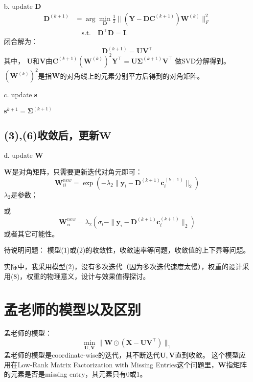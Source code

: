 \documentclass[10pt,twocolumn,letterpaper]{article}
\begin{document}
b. update $\mathbf{D}$
\begin{equation}
\begin{split}
\mathbf{D}^{(k+1)}
&
=
\arg\min_{\mathbf{D}}\frac{1}{2}\|(\mathbf{Y}-\mathbf{D}\mathbf{C}^{(k+1)})\mathbf{W}^{(k)}\|_{F}^{2}
\\
&
\quad
\text{s.t.}
\quad
\mathbf{D}^{\top}\mathbf{D} =\mathbf{I}. 
\end{split}
\end{equation}
闭合解为：
\begin{equation}
\mathbf{D}^{(k+1)}
=
\mathbf{U}\mathbf{V}^{\top}
\end{equation}
其中，
$\mathbf{U}$和$\mathbf{V}$由$\mathbf{C}^{(k+1)}(\mathbf{W}^{(k)})^{2}\mathbf{Y}^{\top}=\mathbf{U}\mathbf{\Sigma}^{(k+1)}\mathbf{V}^{\top}
$
做SVD分解得到。$(\mathbf{W}^{(k)})^{2}$是指$\mathbf{W}$的对角线上的元素分别平方后得到的对角矩阵。

c. update $\mathbf{s}$

$\mathbf{s}^{k+1}=\mathbf{\Sigma}^{(k+1)}$

\subsection{(3),(6)收敛后，更新$\mathbf{W}$}
d. update $\mathbf{W}$

$\mathbf{W}$是对角矩阵，只需要更新迭代对角元即可：
\begin{equation}
\mathbf{W}_{ii}^{new}=\exp(-\lambda_{2}\|\mathbf{y}_{i}-\mathbf{D}^{(k+1)}\mathbf{c}_{i}^{(k+1)}\|_{2})
\end{equation}
$\lambda_{2}$是参数；

或
\begin{equation}
\mathbf{W}_{ii}^{new}=\lambda_{2}(\sigma_{i}-\|\mathbf{y}_{i}-\mathbf{D}^{(k+1)}\mathbf{c}_{i}^{(k+1)}\|_{2})
\end{equation}
或者其它可能性。

待说明问题：
模型(1)或(2)的收敛性，收敛速率等问题，收敛值的上下界等问题。

实际中，我采用模型(2)，没有多次迭代（因为多次迭代速度太慢），权重的设计采用(8)，权重的物理意义，设计与效果值得探讨。

\section{孟老师的模型以及区别}
孟老师的模型：
\begin{equation}
\min_{\mathbf{U},\mathbf{V}}\|\mathbf{W}\odot(\mathbf{X}-\mathbf{U}\mathbf{V}^{\top})\|_{1}
\end{equation}
孟老师的模型是coordinate-wise的迭代，其不断迭代$\mathbf{U},\mathbf{V}$直到收敛。
这个模型应用在Low-Rank Matrix Factorization with Missing Entries这个问题里，$\mathbf{W}$指矩阵的元素是否是missing entry，其元素只有0或1。
\end{document}
